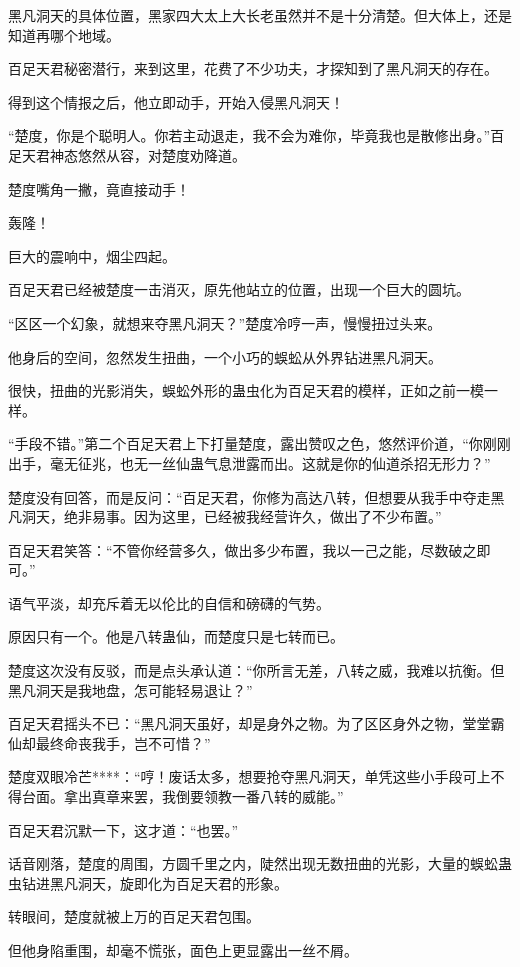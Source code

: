 \begin{this_body}
黑凡洞天的具体位置，黑家四大太上大长老虽然并不是十分清楚。但大体上，还是知道再哪个地域。

百足天君秘密潜行，来到这里，花费了不少功夫，才探知到了黑凡洞天的存在。

得到这个情报之后，他立即动手，开始入侵黑凡洞天！

“楚度，你是个聪明人。你若主动退走，我不会为难你，毕竟我也是散修出身。”百足天君神态悠然从容，对楚度劝降道。

楚度嘴角一撇，竟直接动手！

轰隆！

巨大的震响中，烟尘四起。

百足天君已经被楚度一击消灭，原先他站立的位置，出现一个巨大的圆坑。

“区区一个幻象，就想来夺黑凡洞天？”楚度冷哼一声，慢慢扭过头来。

他身后的空间，忽然发生扭曲，一个小巧的蜈蚣从外界钻进黑凡洞天。

很快，扭曲的光影消失，蜈蚣外形的蛊虫化为百足天君的模样，正如之前一模一样。

“手段不错。”第二个百足天君上下打量楚度，露出赞叹之色，悠然评价道，“你刚刚出手，毫无征兆，也无一丝仙蛊气息泄露而出。这就是你的仙道杀招无形力？”

楚度没有回答，而是反问：“百足天君，你修为高达八转，但想要从我手中夺走黑凡洞天，绝非易事。因为这里，已经被我经营许久，做出了不少布置。”

百足天君笑答：“不管你经营多久，做出多少布置，我以一己之能，尽数破之即可。”

语气平淡，却充斥着无以伦比的自信和磅礴的气势。

原因只有一个。他是八转蛊仙，而楚度只是七转而已。

楚度这次没有反驳，而是点头承认道：“你所言无差，八转之威，我难以抗衡。但黑凡洞天是我地盘，怎可能轻易退让？”

百足天君摇头不已：“黑凡洞天虽好，却是身外之物。为了区区身外之物，堂堂霸仙却最终命丧我手，岂不可惜？”

楚度双眼冷芒****：“哼！废话太多，想要抢夺黑凡洞天，单凭这些小手段可上不得台面。拿出真章来罢，我倒要领教一番八转的威能。”

百足天君沉默一下，这才道：“也罢。”

话音刚落，楚度的周围，方圆千里之内，陡然出现无数扭曲的光影，大量的蜈蚣蛊虫钻进黑凡洞天，旋即化为百足天君的形象。

转眼间，楚度就被上万的百足天君包围。

但他身陷重围，却毫不慌张，面色上更显露出一丝不屑。


\end{this_body}
